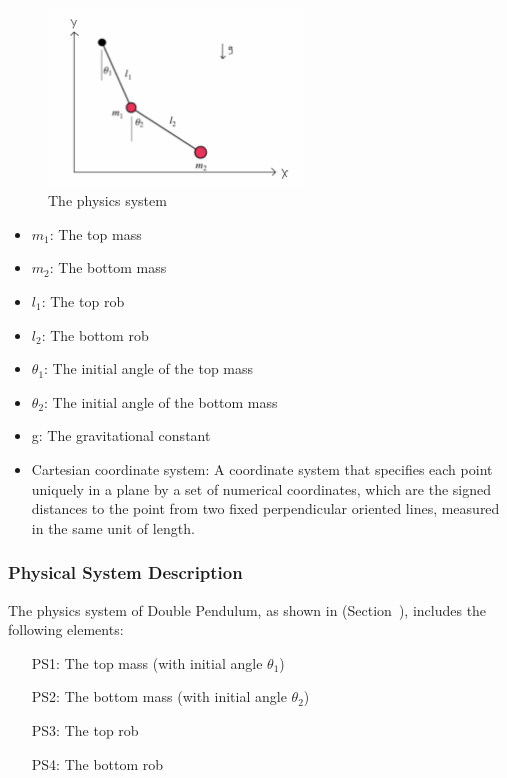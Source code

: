 \documentclass[12pt]{article}
\begin{document}
\begin{figure}[h!]
\begin{center}
 \includegraphics[width=0.6\textwidth]{dp}
\caption{The physics system}
\label{Fig_physics system} 
\end{center}
\end{figure}

\begin{itemize}

\item $m_1$: The top mass 
\item $m_2$: The bottom mass
\item $l_1$: The top rob
\item $l_2$: The bottom rob
\item $\theta_1$: The initial angle of the top mass
\item $\theta_2$: The initial angle of the bottom mass
\item g: The gravitational constant 
\item Cartesian coordinate system: A coordinate system that specifies each point uniquely in a plane by a set of numerical coordinates, which are the signed distances to the point from two fixed perpendicular oriented lines, measured in the same unit of length. 

\end{itemize}


\subsubsection{Physical System Description}\label{sec_physicsSysDes}
The physics system of Double Pendulum, as shown in (Section~), includes the following elements:
\begin{itemize}

\item[PS1:] The top mass (with initial angle $\theta_1$)
\item[PS2:] The bottom mass (with initial angle $\theta_2$)
\item[PS3:] The top rob
\item[PS4:] The bottom rob

\end{itemize}
\end{document}
